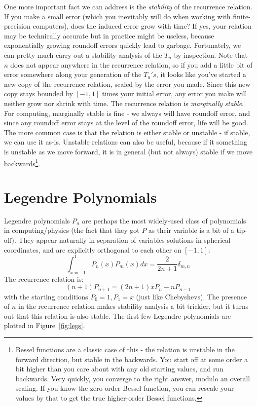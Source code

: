 \documentclass[12]{article}
\begin{document}
One more important fact we can address is the \textit{stability} of
the recurrence relation.  If you make a small error (which you
inevitably will do when working with finite-precision computers), does
the induced error grow with time?  If yes, your relation may be
technically accurate but in practice might be useless, because exponentially
growing roundoff errors quickly lead to garbage.  Fortunately, we can
pretty much carry out a stability analysis of the $T_n$ by inspection.
Note that $n$ does not appear anywhere in the recurrence relation, so
if you add a little bit of error somewhere along your generation of
the $T_n's$, it looks like you've started a new copy of the recurrence
relation, scaled by the error you made.  Since this new copy stays
bounded by $[-1,1]$ times your initial error, any error you make will
neither grow nor shrink with time.  The recurrence relation is
\textit{marginally stable}.  For computing, marginally stable is fine
- we always will have roundoff error, and since any roundoff error
stays at the level of the roundoff error, life will be good.   The
more common case is that the relation is either stable or unstable -
if stable, we can use it as-is.  Unstable relations can also be 
useful, because if it something is unstable as we move forward, it is
in general (but not always) stable if we move
backwards\footnote{Bessel functions are a 
  classic case of this - the relation is unstable in the forward
  direction, but stable in the backwards.  You start off at some
  order a bit higher than you care about with any old starting values,
  and run backwards.  Very quickly, you converge to the right answer,
  modulo an overall scaling.  If you know the zero-order Bessel
  function, you can rescale your values by that to get the
  true higher-order Bessel functions.}.

\section{Legendre Polynomials}
Legendre polynomials $P_n$ are perhaps the most widely-used class of
polynomials in computing/physics (the fact that they got $P$ as their
variable is a bit of a tip-off).  They appear naturally in
separation-of-variables solutions in spherical coordinates, and are
explicitly orthogonal to each other on $[-1,1]$:
$$\int_{x=-1}^1 P_n(x) P_m(x) dx = \frac{2}{2n+1}\delta_{m,n}$$
The recurrence relation is:
$$(n+1)P_{n+1}=(2n+1)xP_n - nP_{n-1}$$
with the starting conditions $P_0=1, P_1=x$ (just like Chebyshevs).
The presence of $n$ in the recurrence relation makes stability
analysis a bit trickier, but it turns out that this relation is also
stable.  The first few Legendre polynomials are plotted in
Figure~\ref{fig:legs}.  
\end{document}
